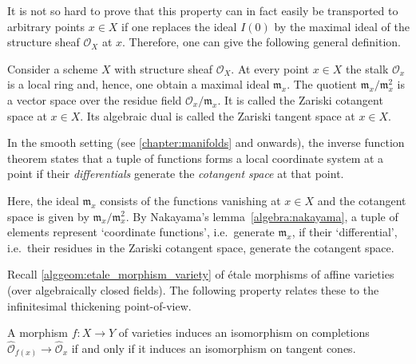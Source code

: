     It is not so hard to prove that this property can in fact easily be transported to arbitrary points $x\in X$ if one replaces the ideal $I(0)$ by the maximal ideal of the structure sheaf $\mathcal{O}_X$ at $x$. Therefore, one can give the following general definition.
    \begin{definition}
        Consider a scheme $X$ with structure sheaf $\mathcal{O}_X$. At every point $x\in X$ the stalk $\mathcal{O}_x$ is a local ring and, hence, one obtain a maximal ideal $\mathfrak{m}_x$. The quotient $\mathfrak{m}_x/\mathfrak{m}_x^2$ is a vector space over the residue field $\mathcal{O}_x/\mathfrak{m}_x$. It is called the Zariski cotangent space at $x\in X$. Its algebraic dual is called the Zariski tangent space at $x\in X$.
    \end{definition}
    \begin{property}
        In the smooth setting (see \cref{chapter:manifolds} and onwards), the inverse function theorem states that a tuple of functions forms a local coordinate system at a point if their \textit{differentials} generate the \textit{cotangent space} at that point.

        Here, the ideal $\mathfrak{m}_x$ consists of the functions vanishing at $x\in X$ and the cotangent space is given by $\mathfrak{m}_x/\mathfrak{m}_x^2$. By Nakayama's lemma~\ref{algebra:nakayama}, a tuple of elements represent `coordinate functions', i.e.~generate $\mathfrak{m}_x$, if their `differential', i.e.~their residues in the Zariski cotangent space, generate the cotangent space.
    \end{property}



    Recall \cref{alggeom:etale_morphism_variety} of \'etale morphisms of affine varieties (over algebraically closed fields). The following property relates these to the infinitesimal thickening point-of-view.
    \begin{property}\label{alggeom:tangent_cone_etale}
        A morphism $f:X\rightarrow Y$ of varieties induces an isomorphism on completions $\widehat{\mathcal{O}}_{f(x)}\rightarrow\widehat{\mathcal{O}}_x$ if and only if it induces an isomorphism on tangent cones.
    \end{property}

